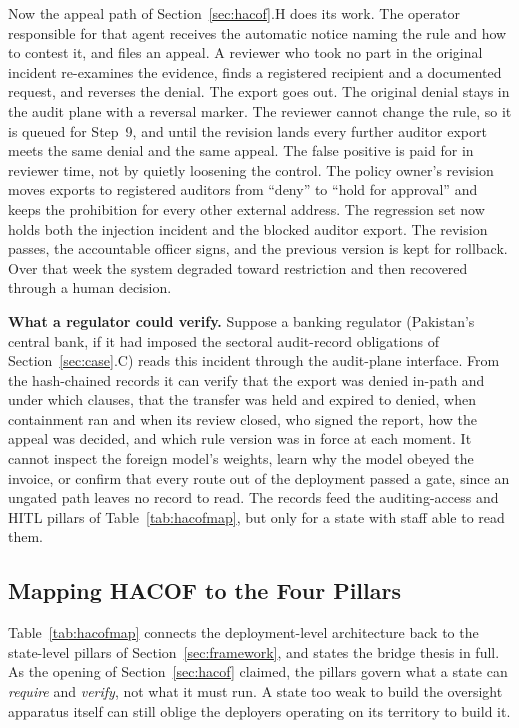 \documentclass{ieeeaccess}
\newcommand{\hacof}{HACOF}
\begin{document}
Now the appeal path of Section~\ref{sec:hacof}.H does its work. The operator responsible for that agent receives the automatic notice naming the rule and how to contest it, and files an appeal. A reviewer who took no part in the original incident re-examines the evidence, finds a registered recipient and a documented request, and reverses the denial. The export goes out. The original denial stays in the audit plane with a reversal marker. The reviewer cannot change the rule, so it is queued for Step~9, and until the revision lands every further auditor export meets the same denial and the same appeal. The false positive is paid for in reviewer time, not by quietly loosening the control. The policy owner's revision moves exports to registered auditors from ``deny'' to ``hold for approval'' and keeps the prohibition for every other external address. The regression set now holds both the injection incident and the blocked auditor export. The revision passes, the accountable officer signs, and the previous version is kept for rollback. Over that week the system degraded toward restriction and then recovered through a human decision.

\textbf{What a regulator could verify.} Suppose a banking regulator (Pakistan's central bank, if it had imposed the sectoral audit-record obligations of Section~\ref{sec:case}.C) reads this incident through the audit-plane interface. From the hash-chained records it can verify that the export was denied in-path and under which clauses, that the transfer was held and expired to denied, when containment ran and when its review closed, who signed the report, how the appeal was decided, and which rule version was in force at each moment. It cannot inspect the foreign model's weights, learn why the model obeyed the invoice, or confirm that every route out of the deployment passed a gate, since an ungated path leaves no record to read. The records feed the auditing-access and HITL pillars of Table~\ref{tab:hacofmap}, but only for a state with staff able to read them.

\subsection{Mapping \hacof{} to the Four Pillars}
\label{sec:hacof-mapping}

Table~\ref{tab:hacofmap} connects the deployment-level architecture back to the state-level pillars of Section~\ref{sec:framework}, and states the bridge thesis in full. As the opening of Section~\ref{sec:hacof} claimed, the pillars govern what a state can \textit{require} and \textit{verify}, not what it must run. A state too weak to build the oversight apparatus itself can still oblige the deployers operating on its territory to build it.
\end{document}
